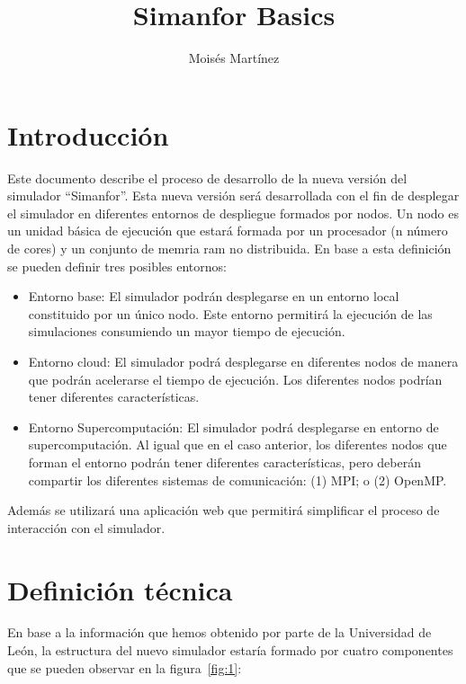 \documentclass{article}
\title{Simanfor Basics}
\author{Moisés Martínez}
\begin{document}
\maketitle

\section{Introducción}

Este documento describe el proceso de desarrollo de la nueva versión del simulador “Simanfor”. Esta nueva versión será desarrollada con el fin de desplegar el simulador en diferentes entornos de despliegue formados por nodos. Un nodo es un unidad básica de ejecución que estará formada por un procesador (n número de cores) y un conjunto de memria ram no distribuida. En base a esta definición se pueden definir tres posibles entornos:

\begin{itemize}
\item Entorno base: El simulador podrán desplegarse en un entorno local constituido por un único nodo. Este entorno permitirá la ejecución de las simulaciones consumiendo un mayor tiempo de ejecución. 
\item Entorno cloud: El simulador podrá desplegarse en diferentes nodos de manera que podrán acelerarse el tiempo de ejecución. Los diferentes nodos podrían tener diferentes características. 
\item Entorno Supercomputación: El simulador podrá desplegarse en entorno de supercomputación. Al igual que en el caso anterior, los diferentes nodos que forman el entorno podrán tener diferentes características, pero deberán compartir los diferentes sistemas de comunicación: (1) MPI; o (2) OpenMP. 
\end{itemize}

Además se utilizará una aplicación web que permitirá simplificar el proceso de interacción con el simulador. 

\section{Definición técnica}

En base a la información que hemos obtenido por parte de la Universidad de León, la estructura del nuevo simulador estaría formado por cuatro componentes que se pueden observar en la figura~\ref{fig:1}:
\end{document}

